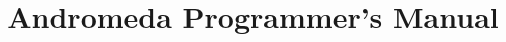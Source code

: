 \documentclass[11pt]{article}
\begin{document}
\title{Andromeda Programmer's Manual}
\end{document}
